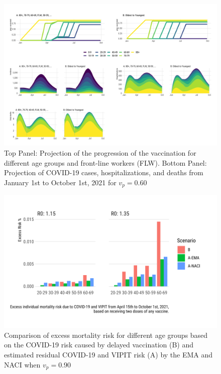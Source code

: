 \documentclass[]{elsarticle} %
\begin{document}
\begin{figure}[htb]
\begin{center}
\includegraphics[width=6in]{"../figures/vp0.60/fig-trajectoriesFull.pdf"}
\caption{Top Panel: Projection of the progression of the vaccination for different age groups and front-line workers (FLW). Bottom Panel: Projection of COVID-19 cases, hospitalizations, and deaths from January 1st to October 1st, 2021 for $v_p=0.60$}
\end{center}
\end{figure}

\begin{figure}[htb]
\begin{center}
\includegraphics[width=6in]{"../figures/vp0.60/fig3.pdf"}
\caption{Comparison of excess mortality risk for different age groups based on the COVID-19 risk caused by delayed vaccination (B) and estimated residual COVID-19 and VIPIT risk (A) by the EMA and NACI when $v_p=0.90$}
\end{center}
\end{figure}
\end{document}
